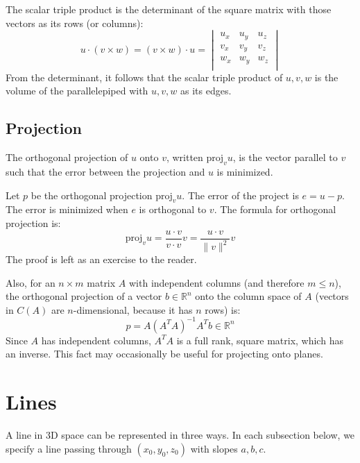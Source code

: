 \documentclass{article}
\begin{document}
The scalar triple product is the determinant of the square matrix with those vectors as its rows (or columns):
\begin{equation*}
	u\cdot(v\times w)
	=(v\times w)\cdot u
	=\begin{vmatrix}
		u_x & u_y & u_z \\
		v_x & v_y & v_z \\
		w_x & w_y & w_z \\
	\end{vmatrix}
\end{equation*}
From the determinant, it follows that the scalar triple product of $u,v,w$ is the volume of the parallelepiped with $u,v,w$ as its edges.

\subsection{Projection}

The orthogonal projection of $u$ onto $v$, written $\mathrm{proj}_v u$, is the vector parallel to $v$ such that the error between the projection and $u$ is minimized.

Let $p$ be the orthogonal projection $\mathrm{proj}_v u$. The error of the project is $e=u-p$. The error is minimized when $e$ is orthogonal to $v$. The formula for orthogonal projection is:
\begin{equation*}
	\mathrm{proj}_vu
	=\frac{u\cdot v}{v\cdot v}v
	=\frac{u\cdot v}{\lVert v \rVert ^2}v
\end{equation*}
The proof is left as an exercise to the reader.

Also, for an $n\times m$ matrix $A$ with independent columns (and therefore $m\leq n$), the orthogonal projection of a vector $b\in\mathbb R^n$ onto the column space of $A$ (vectors in $C(A)$ are $n$-dimensional, because it has $n$ rows) is:
\begin{equation*}
	 p=A(A^T A)^{-1}A^T b \in \mathbb R^n
\end{equation*}
Since $A$ has independent columns, $A^T A$ is a full rank, square matrix, which has an inverse. This fact may occasionally be useful for projecting onto planes.

\section{Lines}

A line in 3D space can be represented in three ways. In each subsection below, we specify a line passing through $(x_0,y_0,z_0)$ with slopes $a,b,c$.
\end{document}
